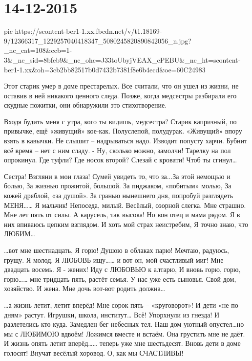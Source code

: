  
 
 
 
 
\section{14-12-2015}

\ifcmt
  pic https://scontent-ber1-1.xx.fbcdn.net/v/t1.18169-9/12366317_1229257040418347_5080245820890842056_n.jpg?_nc_cat=108&ccb=1-3&_nc_sid=8bfeb9&_nc_ohc=J33toUbyjVEAX_cPEBU&_nc_ht=scontent-ber1-1.xx&oh=3cb2bb82517b0d7432b7381f8e6b4ecd&oe=60C24983
\fi

Этот старик умер в доме престарелых. Все считали, что он ушел из жизни, не
оставив в ней никакого ценного следа. Позже, когда медсестры разбирали его
скудные пожитки, они обнаружили это стихотворение.

Входя будить меня с утра, кого ты видишь, медсестра? Старик капризный, по
привычке, ещё «живущий» кое-как. Полуслепой, полудурак. «Живущий» впору взять в
кавычки. Не слышит – надрываться надо. Изводит попусту харчи. Бубнит всё время
– нет с ним сладу. - Ну, сколько можно, замолчи! Тарелку на пол опрокинул. Где
туфли? Где носок второй? Слезай с кровати! Чтоб ты сгинул…

Сестра! Взгляни в мои глаза! Сумей увидеть то, что за...За этой немощью и
болью, За жизнью прожитой, большой. За пиджаком, «побитым» молью, За кожей
дряблой, «за душой». За гранью нынешнего дня, попробуй разглядеть МЕНЯ…… Я
мальчик! Непоседа, милый. Весёлый, озорной слегка. Мне страшно. Мне лет пять от
силы. А карусель, так высока! Но вон отец и мама рядом. Я в них впиваюсь цепким
взглядом. И хоть мой страх неистребим, Я точно знаю, что ЛЮБИМ…

…вот мне шестнадцать, Я горю! Душою в облаках парю! Мечтаю, радуюсь, грущу. Я
молод, Я ЛЮБОВЬ ищу…… и вот он, мой счастливый миг! Мне двадцать восемь. Я -
жених! Иду с ЛЮБОВЬЮ к алтарю, И вновь горю, горю, горю…… мне тридцать пять,
растёт семья. У нас уже есть сыновья. Свой дом, хозяйство. И жена. Мне дочь
вот-вот родить должна…

…а жизнь летит, летит вперёд! Мне сорок пять – «круговорот»! И дети «не по
дням» растут. Игрушки, школа, институт… Всё! Упорхнули из гнезда! И разлетелись
кто куда. Замедлен бег небесных тел. Наш дом уютный опустел…но мы с ЛЮБИМОЮ
вдвоём! Ложимся вместе и встаём. Она грустить мне не даёт. И жизнь опять летит
вперёд…… теперь уже мне шестьдесят. Вновь дети в доме голосят! Внучат весёлый
хоровод. О, как мы СЧАСТЛИВЫ!

